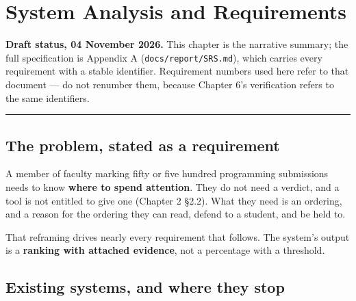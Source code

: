 \hypertarget{system-analysis-and-requirements}{%
\chapter{System Analysis and
Requirements}\label{system-analysis-and-requirements}}

\begin{draftnote}

\textbf{Draft status, 04 November 2026.} This chapter is the narrative
summary; the full specification is Appendix A
(\texttt{docs/report/SRS.md}), which carries every requirement with a
stable identifier. Requirement numbers used here refer to that document
--- do not renumber them, because Chapter 6's verification refers to the
same identifiers.

\end{draftnote}

\begin{center}\rule{0.5\linewidth}{0.5pt}\end{center}

\hypertarget{the-problem-stated-as-a-requirement}{%
\section{The problem, stated as a
requirement}\label{the-problem-stated-as-a-requirement}}

A member of faculty marking fifty or five hundred programming
submissions needs to know \textbf{where to spend attention}. They do not
need a verdict, and a tool is not entitled to give one (Chapter 2 \S{}2.2).
What they need is an ordering, and a reason for the ordering they can
read, defend to a student, and be held to.

That reframing drives nearly every requirement that follows. The
system's output is a \textbf{ranking with attached evidence}, not a
percentage with a threshold.

\hypertarget{existing-systems-and-where-they-stop}{%
\section{Existing systems, and where they
stop}\label{existing-systems-and-where-they-stop}}

